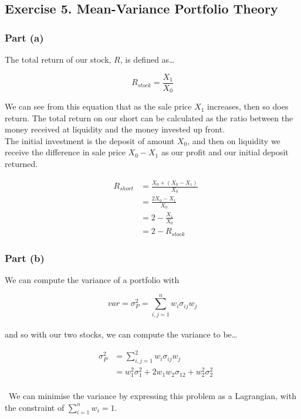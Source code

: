 \documentclass[11pt]{article}
\begin{document}

\subsection*{Exercise 5. Mean-Variance Portfolio Theory}

\subsubsection*{Part (a)}

The total return of our stock, $R$, is defined as\dots

\[ R_{stock} = \frac{X_{1}}{X_{0}} \]

We can see from this equation that as the sale price $X_{1}$ increases, then so does return.
The total return on our short can be calculated as the ratio between the money received at
liquidity and the money invested up front. \\

The initial investment is the deposit of amount $X_{0}$, and then on liquidity we receive
the difference in sale price $X_{0} - X_{1}$ as our profit and our initial deposit returned.

\setcounter{equation}{0}
\begin{eqnarray}
  & R_{short} &= \frac{X_{0} + \left(X_{0} - X_{1}\right)}{X_{0}} \\
  &&= \frac{2X_{0} - X_{1}}{X_{0}} \\
  &&= 2 - \frac{X_{1}}{X_{0}} \\
  &&= 2 - R_{stock}
\end{eqnarray}

\subsubsection*{Part (b)}

We can compute the variance of a portfolio with

\[ var = \sigma^{2}_{P} = \sum_{i,j=1}^{n} w_{i} \sigma_{ij} w_{j} \] \\

and so with our two stocks, we can compute the variance to be\dots

\begin{eqnarray}
  & \sigma^{2}_{P} &= \sum_{i,j=1}^{2} w_{i} \sigma_{ij} w_{j} \\
  &&= w_{1}^{2}\sigma^{2}_{1} + 2w_{1}w_{2}\sigma_{12} + w_{2}^{2}\sigma^{2}_{2}
\end{eqnarray}\\[1mm]
\
We can minimise the variance by expressing this problem as a Lagrangian, with the constraint
of $\sum_{i=1}^{n} w_{i} = 1$.
\end{document}
